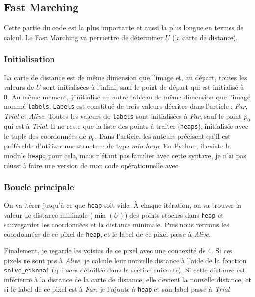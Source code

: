 \documentclass{article}
\begin{document}
\subsection{Fast Marching}
Cette partie du code est la plus importante et aussi la plus longue en termes de calcul.
Le Fast Marching va permettre de déterminer $U$ (la carte de distance).

\subsubsection{Initialisation}
La carte de distance est de même dimension que l'image et, au départ, toutes les valeurs de
$U$ sont initialisées à l'infini, sauf le point de départ qui est initialisé à 0. 
Au même moment, j'initialise un autre tableau de même dimension que l'image nommé 
\texttt{labels}. \texttt{Labels} est constitué de trois valeurs décrites dans 
l'article : \textit{Far}, \textit{Trial} et \textit{Alive}. Toutes les valeurs de 
\texttt{labels} sont initialisées à \textit{Far}, sauf le point $p_0$ qui est à 
\textit{Trial}. Il ne reste que la liste des points à traiter (\texttt{heaps}), 
initialisée avec le tuple des coordonnées de $p_0$. Dans l'article, les auteurs 
précisent qu'il est préférable d'utiliser une structure de type \textit{min-heap}. 
En Python, il existe le module \texttt{heapq} pour cela, mais n'étant pas familier 
avec cette syntaxe, je n'ai pas réussi à faire une version de mon code opérationnelle avec.

\subsubsection{Boucle principale}
On va itérer jusqu'à ce que \texttt{heap} soit vide. À chaque itération, on va 
trouver la valeur de distance minimale ($\min(U)$) des points stockés dans 
\texttt{heap} et sauvegarder les coordonnées et la distance minimale. Puis nous 
retirons les coordonnées de ce pixel de \texttt{heap}, et le label de ce pixel 
passe à \textit{Alive}.

Finalement, je regarde les voisins de ce pixel avec une connexité de 4. 
Si ces pixels ne sont pas à \textit{Alive}, je calcule leur nouvelle distance à l'aide de la fonction 
\texttt{solve\_eikonal} (qui sera détaillée dans la section suivante). 
Si cette distance est inférieure à la distance de la carte de distance, elle devient la nouvelle distance, 
et si le label de ce pixel est à \textit{Far}, je l'ajoute à \texttt{heap} et son label passe à \textit{Trial}.
\end{document}
